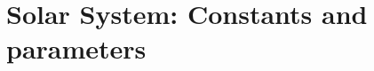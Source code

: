 \documentclass[Orbiter User Manual.tex]{subfiles}
\begin{document}
\section{Solar System: Constants and parameters}

\end{document}
